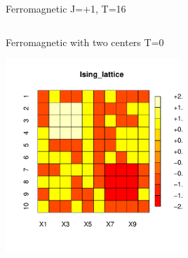 \documentclass{beamer}
\begin{document}
\begin{frame}{Ferromagnetic J=+1, T=16}
\begin{columns}
\begin{column}{0.5\textwidth}
\begin{center}
     \end{center}
\end{column}
\end{columns}
\end{frame}



\begin{frame}{Ferromagnetic with two centers T=0}
    \begin{center}
     \includegraphics[width=0.5\textwidth]{Pic/2CENTER.pdf}
     \end{center}
\end{frame}
\end{document}
